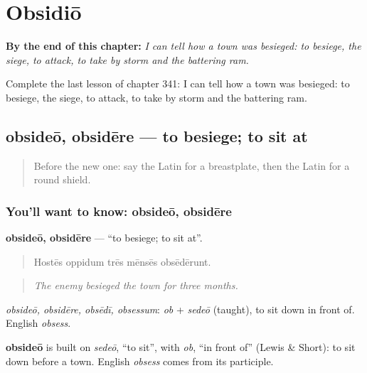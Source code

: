 
\chapter{Obsidiō}
\label{ch:la-obsidio}

\begin{chapteropening}
\textbf{By the end of this chapter:} \emph{I can tell how a town was besieged: to besiege, the siege, to attack, to take by storm and the battering ram.}

Complete the last lesson of chapter 341: I can tell how a town was besieged: to besiege, the siege, to attack, to take by storm and the battering ram.
\end{chapteropening}

\section[obsideō, obsidēre]{obsideō, obsidēre — to besiege; to sit at}

\label{lesson:LA-C341-obsideo}



\begin{quote}
Before the new one: say the Latin for a breastplate, then the Latin for a round shield.
\end{quote}

\subsection*{You'll want to know: obsideō, obsidēre}
\textbf{obsideō, obsidēre} — \textquotedblleft{}to besiege; to sit at\textquotedblright{}.

\begin{quote}
Hostēs oppidum trēs mēnsēs obsēdērunt.
\end{quote}

\begin{quote}
\emph{The enemy besieged the town for three months.}
\end{quote}

\emph{obsideō, obsidēre, obsēdī, obsessum}: \emph{ob} + \emph{sedeō} (taught), to sit down in front of. English \emph{obsess}.

\begin{cousinweb}
\textbf{obsideō} is built on \emph{sedeō}, \textquotedblleft{}to sit\textquotedblright{}, with \emph{ob}, \textquotedblleft{}in front of\textquotedblright{} (Lewis \& Short): to sit down before a town. English \emph{obsess} comes from its participle.
\end{cousinweb}

